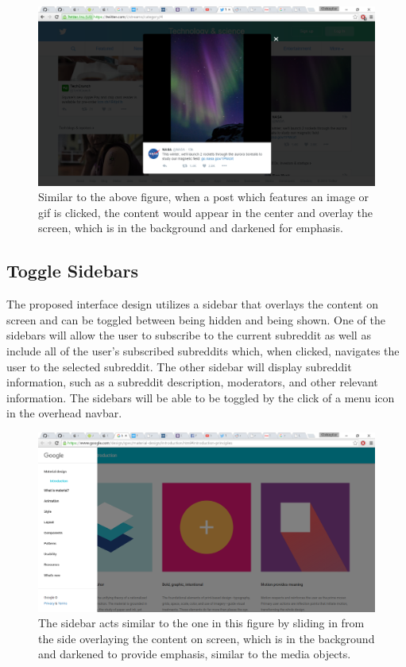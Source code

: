 \documentclass{article}
\begin{document}
\begin{figure}[H]
\begin{center}
\includegraphics[width=1\textwidth]{media.png}
\caption{Similar to the above figure, when a post which features an image or gif is clicked, the content would appear in the center and overlay the screen, which is in the background and darkened for emphasis.}
\end{center}
\end{figure}

\subsection{Toggle Sidebars} The proposed interface design utilizes a sidebar that overlays the content on screen and can be toggled between being hidden and being shown. One of the sidebars will allow the user to subscribe to the current subreddit as well as include all of the user's subscribed subreddits which, when clicked, navigates the user to the selected subreddit. The other sidebar will display subreddit information, such as a subreddit description, moderators, and other relevant information. The sidebars will be able to be toggled by the click of a menu icon in the overhead navbar.

\begin{figure}[H]
\begin{center}
\includegraphics[width=1\textwidth]{sidebar.png}
\caption{The sidebar acts similar to the one in this figure by sliding in from the side overlaying the content on screen, which is in the background and darkened to provide emphasis, similar to the media objects.}
\end{center}
\end{figure}
\end{document}
